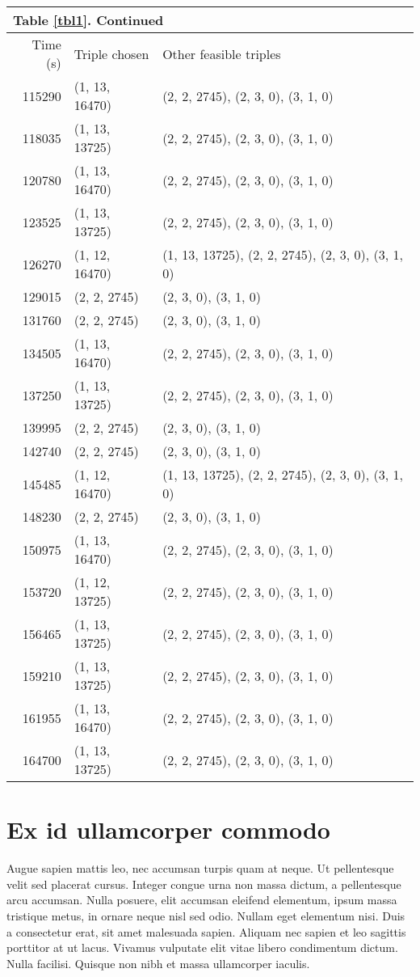 \begin{table}[h!t!]
\begin{tabularx}{6.5 in}{r l X}
\multicolumn{3}{l}{Table \ref{tbl1}. Continued}\\%
\hline {{Time (s)}} & {{Triple chosen}} & {{Other feasible triples}} \\ \hline
115290 & (1, 13, 16470) & (2, 2, 2745), (2, 3, 0), (3, 1, 0) \\
118035 & (1, 13, 13725) & (2, 2, 2745), (2, 3, 0), (3, 1, 0) \\
120780 & (1, 13, 16470) & (2, 2, 2745), (2, 3, 0), (3, 1, 0) \\
123525 & (1, 13, 13725) & (2, 2, 2745), (2, 3, 0), (3, 1, 0) \\
126270 & (1, 12, 16470) & (1, 13, 13725), (2, 2, 2745), (2, 3, 0), (3, 1, 0) \\
129015 & (2, 2, 2745) & (2, 3, 0), (3, 1, 0) \\
131760 & (2, 2, 2745) & (2, 3, 0), (3, 1, 0) \\
134505 & (1, 13, 16470) & (2, 2, 2745), (2, 3, 0), (3, 1, 0) \\
137250 & (1, 13, 13725) & (2, 2, 2745), (2, 3, 0), (3, 1, 0) \\
139995 & (2, 2, 2745) & (2, 3, 0), (3, 1, 0) \\
142740 & (2, 2, 2745) & (2, 3, 0), (3, 1, 0) \\
145485 & (1, 12, 16470) & (1, 13, 13725), (2, 2, 2745), (2, 3, 0), (3, 1, 0)\\%
148230 & (2, 2, 2745) & (2, 3, 0), (3, 1, 0) \\
150975 & (1, 13, 16470) & (2, 2, 2745), (2, 3, 0), (3, 1, 0) \\
153720 & (1, 12, 13725) & (2, 2, 2745), (2, 3, 0), (3, 1, 0) \\
156465 & (1, 13, 13725) & (2, 2, 2745), (2, 3, 0), (3, 1, 0) \\
159210 & (1, 13, 13725) & (2, 2, 2745), (2, 3, 0), (3, 1, 0) \\
161955 & (1, 13, 16470) & (2, 2, 2745), (2, 3, 0), (3, 1, 0) \\
164700 & (1, 13, 13725) & (2, 2, 2745), (2, 3, 0), (3, 1, 0) \\
\hline
\end{tabularx}
\end{table}

\section{Ex id ullamcorper commodo}
Augue sapien mattis leo, nec accumsan turpis quam at neque. Ut pellentesque velit sed placerat cursus. Integer congue urna non massa dictum, a pellentesque arcu accumsan. Nulla posuere, elit accumsan eleifend elementum, ipsum massa tristique metus, in ornare neque nisl sed odio. Nullam eget elementum nisi. Duis a consectetur erat, sit amet malesuada sapien. Aliquam nec sapien et leo sagittis porttitor at ut lacus. Vivamus vulputate elit vitae libero condimentum dictum. Nulla facilisi. Quisque non nibh et massa ullamcorper iaculis.

